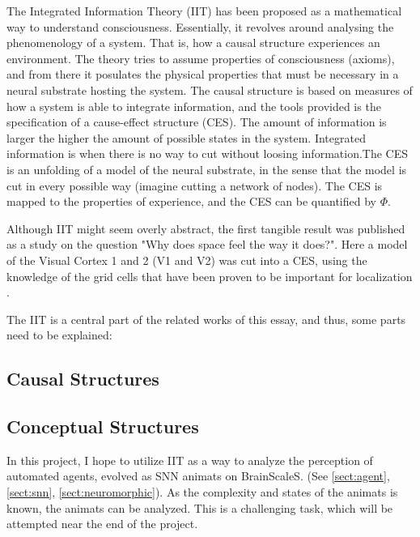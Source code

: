 The Integrated Information Theory (IIT) has been proposed as a mathematical way to understand consciousness.
Essentially, it revolves around analysing the phenomenology of a system.
That is, how a causal structure experiences an environment.
The theory tries to assume properties of consciousness (axioms), and from there it posulates the physical properties that must be necessary in a neural substrate hosting the system.
The causal structure is based on measures of how a system is able to integrate information, and the tools provided is the specification of a cause-effect structure (CES).
The amount of information is larger the higher the amount of possible states in the system. Integrated information is when there is no way to cut without loosing information.The CES is an unfolding of a model of the neural substrate, in the sense that the model is cut in every possible way (imagine cutting a network of nodes).
The CES is mapped to the properties of experience, and the CES can be quantified by $\Phi$. \cite{oizumi_phenomenology_2014}

Although IIT might seem overly abstract, the first tangible result was published as a study on the question "Why does space feel the way it does?".
Here a model of the Visual Cortex 1 and 2 (V1 and V2) was cut into a CES, using the knowledge of the grid cells that have been proven to be important for localization \cite{haun_why_2019}.

The IIT is a central part of the related works of this essay, and thus, some parts need to be explained:
\subsection{Causal Structures}
\subsection{Conceptual Structures}

In this project, I hope to utilize IIT as a way to analyze the perception of automated agents, evolved as SNN animats on BrainScaleS. (See \vref{sect:agent}, \vref{sect:snn}, \vref{sect:neuromorphic}).
As the complexity and states of the animats is known, the animats can be analyzed.
This is a challenging task, which will be attempted near the end of the project.
